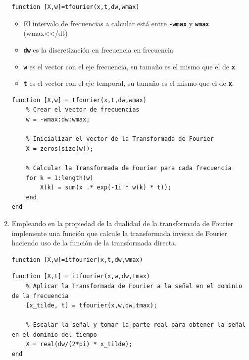 \documentclass{article}
\newcommand{\code}[1]{\texttt{\textbf{#1}}}
\begin{document}
\begin{enumerate}[leftmargin=*]
\begin{lstlisting}
function [X,w]=tfourier(x,t,dw,wmax)
\end{lstlisting}
\begin{itemize}[label=$-$]
\item El intervalo de frecuencias a calcular está entre \code{-wmax} y \code{wmax} (wmax\textless\textless\textpi/dt)
\item \code{dw} es la discretización en frecuencia en frecuencia
\item \code{w} es el vector con el eje frecuencia, su tamaño es el mismo que el de \code{x}.
\item \code{t} es el vector con el eje temporal, su tamaño es el mismo que el de \code{x}.
\end{itemize}
\pagebreak
\begin{lstlisting}
function [X,w] = tfourier(x,t,dw,wmax)
    % Crear el vector de frecuencias
    w = -wmax:dw:wmax;

    % Inicializar el vector de la Transformada de Fourier
    X = zeros(size(w));

    % Calcular la Transformada de Fourier para cada frecuencia
    for k = 1:length(w)
        X(k) = sum(x .* exp(-1i * w(k) * t));
    end
end
\end{lstlisting}
\item Empleando en la propiedad de la dualidad de la transformada de Fourier implemente una función que calcule la transformada inversa de Fourier haciendo uso de la función de la transformada directa.
\begin{lstlisting}
function [X,w]=itfourier(x,t,dw,wmax)
\end{lstlisting}


\begin{lstlisting}
function [X,t] = itfourier(x,w,dw,tmax)
    % Aplicar la Transformada de Fourier a la señal en el dominio de la frecuencia
    [x_tilde, t] = tfourier(x,w,dw,tmax);

    % Escalar la señal y tomar la parte real para obtener la señal en el dominio del tiempo
    X = real(dw/(2*pi) * x_tilde);
end
\end{lstlisting}


\end{enumerate}
\end{document}
